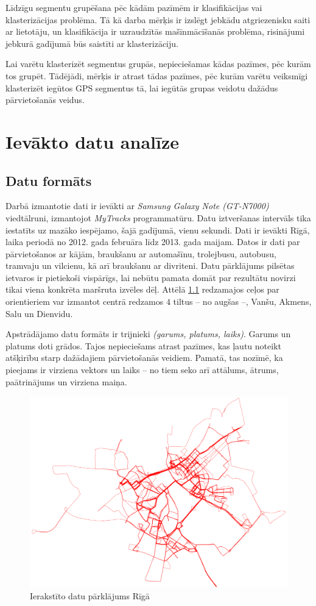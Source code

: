 \documentclass{ludis}
\begin{document}
Līdzīgu segmentu grupēšana pēc kādām pazīmēm ir klasifikācijas vai klasterizācijas problēma. Tā kā
darba mērķis ir izslēgt jebkādu atgriezenisku saiti ar lietotāju, un klasifikācija ir uzraudzītās
mašīnmācīšanās problēma, risinājumi jebkurā gadījumā būs saistīti ar klasterizāciju.

Lai varētu klasterizēt segmentus grupās, nepieciešamas kādas pazīmes, pēc kurām tos grupēt. Tādējādi,
mērķis ir atrast tādas pazīmes, pēc kurām varētu veiksmīgi klasterizēt iegūtos GPS segmentus tā,
lai iegūtās grupas veidotu dažādus pārvietošanās veidus.

\chapter{Ievākto datu analīze}
\section{Datu formāts}
Darbā izmantotie dati ir ievākti ar \emph{Samsung Galaxy Note (GT-N7000)} viedtālruni, izmantojot
\emph{MyTracks} programmatūru. Datu iztveršanas intervāls tika iestatīts uz mazāko iespējamo,
šajā gadījumā, vienu sekundi. Dati ir ievākti Rīgā, laika periodā no 2012. gada februāra līdz 
2013. gada maijam. Datos ir dati par pārvietošanos ar kājām, braukšanu ar automašīnu, trolejbusu,
autobusu, tramvaju un vilcienu, kā arī braukšanu ar divriteni. Datu pārklājums pilsētas ietvaros 
ir pietiekoši vispārīgs, lai nebūtu pamata domāt par rezultātu novirzi tikai viena konkrēta 
maršruta izvēles dēļ. Attēlā \ref{fig:all_trails} redzamajos ceļos par orientieriem var izmantot
centrā redzamos $4$ tiltus -- no augšas --, Vanšu, Akmens, Salu un Dienvidu.

Apstrādājamo datu formāts ir trijnieki \emph{(garums, platums, laiks)}. Garums un platums doti 
grādos. Tajos nepieciešams atrast pazīmes, kas ļautu noteikt atšķirību starp dažādajiem 
pārvietošanās veidiem. Pamatā, tas nozīmē, ka pieejams ir virziena vektors un laiks -- no tiem
seko arī attālums, ātrums, paātrinājums un virziena maiņa.

\begin{figure}
  \centering
  \includegraphics[scale=0.5]{img/all_trails}
  \caption{Ierakstīto datu pārklājums Rīgā}
  \label{fig:all_trails}
\end{figure}
\end{document}
